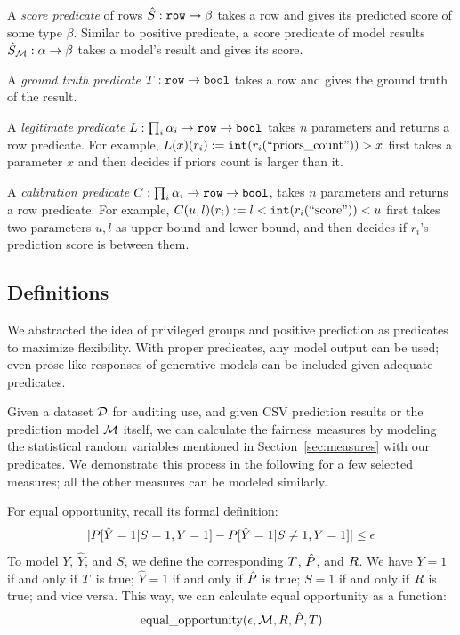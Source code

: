 \documentclass[conference]{IEEEtran}
\begin{document}
A \emph{score predicate} of rows $\hat{S} : \mathtt{row} \rightarrow \beta$ takes a row and gives its predicted score of some type $\beta$. Similar to positive predicate, a score predicate of model results $\hat{S}_\mathcal{M} : \alpha \rightarrow \beta$ takes a model's result and gives its score.

A \emph{ground truth predicate} $T : \mathtt{row} \rightarrow \mathtt{bool}$ takes a row and gives the ground truth of the result.

A \emph{legitimate predicate} $L : \prod_i \alpha_i \rightarrow \mathtt{row} \rightarrow \mathtt{bool}$ takes $n$ parameters and returns a row predicate. For example, $L(x)(r_i) := \mathtt{int}(r_i(\text{``priors\_count''})) > x$ first takes a parameter $x$ and then decides if priors count is larger than it.

A \emph{calibration predicate} $C : \prod_i \alpha_i \rightarrow \mathtt{row} \rightarrow \mathtt{bool}$, takes $n$ parameters and returns a row predicate. For example, $C(u, l)(r_i) := l < \mathtt{int}(r_i(\text{``score''})) < u$ first takes two parameters $u,l$ as upper bound and lower bound, and then decides if $r_i$'s prediction score is between them.

\subsection{Definitions}
We abstracted the idea of privileged groups and positive prediction as predicates to maximize flexibility. With proper predicates, any model output can be used; even prose-like responses of generative models can be included given adequate predicates.

Given a dataset $\mathcal{D}$ for auditing use, and given CSV prediction results or the prediction model $\mathcal{M}$ itself, we can calculate the fairness measures by modeling the statistical random variables mentioned in Section~\ref{sec:measures} with our predicates. We demonstrate this process in the following for a few selected measures; all the other measures can be modeled similarly.

For equal opportunity, recall its formal definition:
\begin{align*}
    \lvert P[\hat{Y} = 1 | S = 1, Y = 1] - P[\hat{Y} = 1 | S \neq 1, Y = 1]\rvert \leq \epsilon
\end{align*}
To model $Y$, $\hat{Y}$, and $S$, we define the corresponding $T$, $\hat{P}$, and $R$. We have $Y = 1$ if and only if $T$ is true; $\hat{Y} = 1$ if and only if $\hat{P}$ is true; $S = 1$ if and only if $R$ is true; and vice versa. This way, we can calculate equal opportunity as a function:
\begin{align*}
    \text{equal\_opportunity} (\epsilon, \mathcal{M}, R, \hat{P}, T)
\end{align*}
\end{document}
